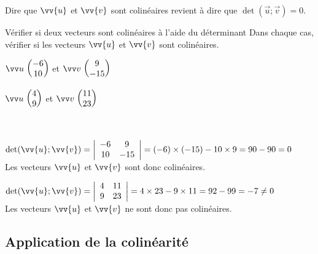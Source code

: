\documentclass[11pt,a4paper]{article}  %
\begin{document}
\begin{bprop}
	Dire que $\vv{u}$ et $\vv{v}$ sont colinéaires revient à dire que $\operatorname{det}(\vec{u} ; \vec{v})=0$.
\end{bprop}

\begin{bmethodet}{Vérifier si deux vecteurs sont colinéaires à l'aide du déterminant}
	Dans chaque cas, vérifier si les vecteurs $\vv{u}$ et $\vv{v}$ sont colinéaires.
	\begin{enumMet}
		\item $\Coord{u}{-6}{10}$ et $\Coord{v}{9}{-15}$
		\item $\Coord{u}{4}{9}$ et $\Coord{v}{11}{23}$
	\end{enumMet}
	\\
	\begin{enumMet}
		\item $\operatorname{det}(\vv{u} ; \vv{v})=\left|\begin{array}{cc}-6 & 9 \\ 10 & -15\end{array}\right|=(-6) \times(-15)-10 \times 9=90-90=0$\\
		Les vecteurs $\vv{u}$ et $\vv{v}$ sont donc colinéaires.
		\item $\operatorname{det}(\vv{u} ; \vv{v})=\left|\begin{array}{ll}4 & 11 \\ 9 & 23\end{array}\right|=4 \times 23-9 \times 11=92-99=-7 \neq 0$\\
		Les vecteurs $\vv{u}$ et $\vv{v}$ ne sont donc pas colinéaires.
	\end{enumMet}
\end{bmethodet}

\subsection{Application de la colinéarité}
\end{document}
